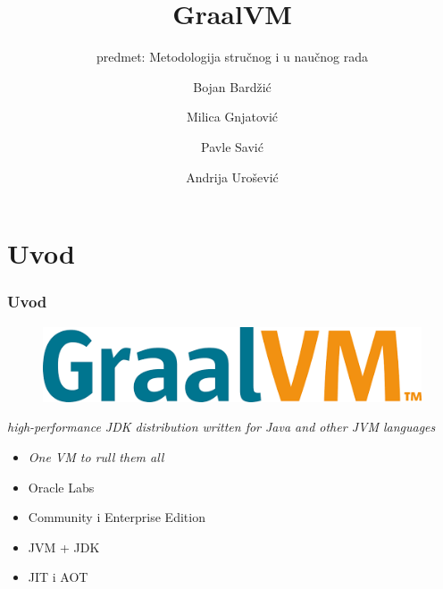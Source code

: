 \documentclass{beamer}
\title{GraalVM}
\subtitle{predmet: Metodologija stručnog i u naučnog rada}
\author{Bojan Bardžić \and Milica Gnjatović \and Pavle Savić \and Andrija Urošević}
\institute{Matematički fakultet}
\date{}
\begin{document}
	\begin{frame}
		\titlepage
	\end{frame}
	
	\section{Uvod}
	\begin{frame}
		\frametitle{Uvod}
		
		\begin{figure}
			\begin{center}
				\includegraphics[width=0.5\linewidth]{imgs/graalvm_logo.png}	
			\end{center} 
		\end{figure}
	
		\center	
		\textit{high-performance JDK distribution written for Java and other JVM languages}

		\begin{flushleft}
			\begin{itemize}
				\item \emph{One VM to rull them all}
				\item Oracle Labs
				\item Community i Enterprise Edition
				\item JVM + JDK	
				\item JIT i AOT
			\end{itemize}
		\end{flushleft}


	\end{frame}
\end{document}
